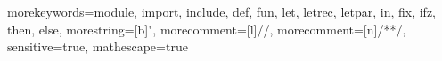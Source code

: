  {
	morekeywords={module, import, include, def, fun, let, letrec, letpar, in, fix,
	ifz, then, else}, morestring=[b]",
	morecomment=[l]{//},
	morecomment=[n]{/*}{*/},
  sensitive=true,
  mathescape=true
}


\newcommand{\pcfmcode}[1]{\lstinline[language=PCFM,basicstyle=\lstinlinestyle,breaklines=false]{#1}}
\newcommand{\pcfmcodefig}[1]{\lstinline[language=PCFM,basicstyle=\lstfigurestyle,breaklines=false]{#1}}
\newcommand{\pcfmcodebl}[1]{\lstinline[language=PCFM,basicstyle=\lstinlinestyle,breaklines=true]{#1}}
\newcommand{\PCFM}{\langname{PCFM}}
\newcommand{\pcfmcodemm}[1]{\lstinline[language=PCFM,basicstyle={\fontfamily{pcr}\fontsize{9pt}{11pt}\selectfont},breaklines=true]{#1}}

